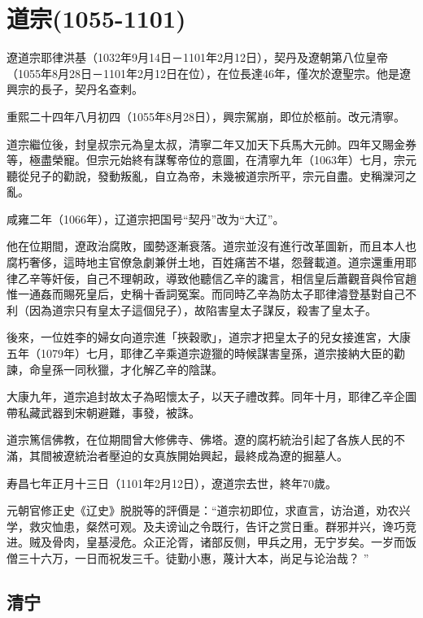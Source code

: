 
\section{道宗\tiny(1055-1101)}

遼道宗耶律洪基（1032年9月14日－1101年2月12日），契丹及遼朝第八位皇帝（1055年8月28日－1101年2月12日在位），在位長達46年，僅次於遼聖宗。他是遼興宗的長子，契丹名查剌。

重熙二十四年八月初四（1055年8月28日），興宗駕崩，即位於柩前。改元清寧。

道宗繼位後，封皇叔宗元為皇太叔，清寧二年又加天下兵馬大元帥。四年又賜金券等，極盡榮寵。但宗元始終有謀奪帝位的意圖，在清寧九年（1063年）七月，宗元聽從兒子的勸說，發動叛亂，自立為帝，未幾被道宗所平，宗元自盡。史稱灤河之亂。

咸雍二年（1066年），辽道宗把国号“契丹”改为“大辽”。

他在位期間，遼政治腐敗，國勢逐漸衰落。道宗並沒有進行改革圖新，而且本人也腐朽奢侈，這時地主官僚急劇兼併土地，百姓痛苦不堪，怨聲載道。道宗還重用耶律乙辛等奸佞，自己不理朝政，導致他聽信乙辛的讒言，相信皇后蕭觀音與伶官趙惟一通姦而賜死皇后，史稱十香詞冤案。而同時乙辛為防太子耶律濬登基對自己不利（因為道宗只有皇太子這個兒子），故陷害皇太子謀反，殺害了皇太子。

後來，一位姓李的婦女向道宗進「挾穀歌」，道宗才把皇太子的兒女接進宮，大康五年（1079年）七月，耶律乙辛乘道宗遊獵的時候謀害皇孫，道宗接納大臣的勸諫，命皇孫一同秋獵，才化解乙辛的陰謀。

大康九年，道宗追封故太子為昭懷太子，以天子禮改葬。同年十月，耶律乙辛企圖帶私藏武器到宋朝避難，事發，被誅。

道宗篤信佛教，在位期間曾大修佛寺、佛塔。遼的腐朽統治引起了各族人民的不滿，其間被遼統治者壓迫的女真族開始興起，最終成為遼的掘墓人。

寿昌七年正月十三日（1101年2月12日），遼道宗去世，終年70歲。

元朝官修正史《辽史》脱脱等的評價是：“道宗初即位，求直言，访治道，劝农兴学，救灾恤患，粲然可观。及夫谤讪之令既行，告讦之赏日重。群邪并兴，谗巧竞进。贼及骨肉，皇基浸危。众正沦胥，诸部反侧，甲兵之用，无宁岁矣。一岁而饭僧三十六万，一日而祝发三千。徒勤小惠，蔑计大本，尚足与论治哉？ ”

\subsection{清宁}

